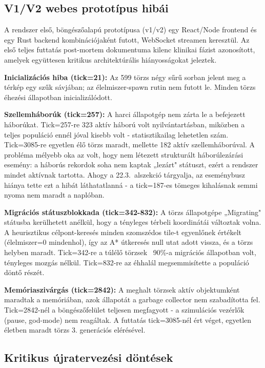 \subsection*{V1/V2 webes prototípus hibái}

A rendszer első, böngészőalapú prototípusa (v1/v2) egy React/Node frontend és egy Rust backend kombinációjaként futott, WebSocket streamen keresztül. Az első teljes futtatás post-mortem dokumentuma kilenc klinikai fázist azonosított, amelyek együttesen kritikus architektúrális hiányosságokat jeleztek.

\textbf{Inicializációs hiba (tick=21):} Az 599 törzs négy sűrű sorban jelent meg a térkép egy szűk sávjában; az élelmiszer-spawn rutin nem futott le. Minden törzs éhezési állapotban inicializálódott.

\textbf{Szellemháborúk (tick=257):} A harci állapotgép nem zárta le a befejezett háborúkat. Tick=257-re 323 aktív háború volt nyilvántartásban, miközben a teljes populáció ennél jóval kisebb volt - statisztikailag lehetetlen szám. Tick=3085-re egyetlen élő törzs maradt, mellette 182 aktív szellemháborúval. A probléma mélyebb oka az volt, hogy nem létezett strukturált háborúlezárási esemény: a háborús rekordok soha nem kaptak „lezárt" státuszt, ezért a rendszer mindet aktívnak tartotta. Ahogy a 22.3.~alszekció tárgyalja, az eseménybusz hiánya tette ezt a hibát láthatatlanná - a tick=187-es tömeges kihalásnak semmi nyoma nem maradt a naplóban.

\textbf{Migrációs státuszblokkada (tick=342-832):} A törzs állapotgépe „Migrating" státusba kerülhetett anélkül, hogy a tényleges térbeli koordinátái változtak volna. A heurisztikus célpont-keresés minden szomszédos tile-t egyenlőnek értékelt (élelmiszer=0 mindenhol), így az A* útkeresés null utat adott vissza, és a törzs helyben maradt. Tick=342-re a túlélő törzsek ~90\%-a migrációs állapotban volt, tényleges mozgás nélkül. Tick=832-re az éhhalál megsemmisítette a populáció döntő részét.

\textbf{Memóriaszivárgás (tick=2842):} A meghalt törzsek aktív objektumként maradtak a memóriában, azok állapotát a garbage collector nem szabadította fel. Tick=2842-nél a böngészőfelület teljesen megfagyott - a szimulációs vezérlők (pause, god-mode) nem reagáltak. A futtatás tick=3085-nél ért véget, egyetlen életben maradt törzs 3. generációs elérésével.

\subsection*{Kritikus újratervezési döntések}

